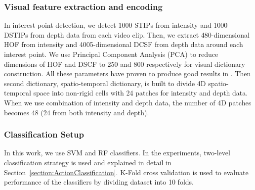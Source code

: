 \documentclass[a4paper, 10pt, conference]{ieeeconf}      %
\begin{document}

    	\subsubsection{Visual feature extraction and encoding}
        \label{section:VisualFeatureExtractionAndEncoding}
        In interest point detection, we detect 1000 STIPs from intensity and 1000 DSTIPs from depth data from each video clip. Then, we extract 480-dimensional HOF from intensity and 4005-dimensional DCSF from depth data around each interest point. We use Principal Component Analysis (PCA) to reduce dimensions of HOF and DSCF to 250 and 800 respectively for visual dictionary construction. All these parameters have proven to produce good results in \cite{c1}. 
        Then second dictionary, spatio-temporal dictionary, is built to divide 4D spatio-temporal space into non-rigid cells with 24 patches for intensity and depth data. When we use combination of intensity and depth data, the number of 4D patches becomes 48 (24 from both intensity and depth).

        
        \subsubsection{Classification Setup}
        \label{section:ClassificationStrategy}
        In this work, we use SVM and RF classifiers. In the experiments, two-level classification strategy is used and explained in detail in Section~\ref{section:ActionClassification}. K-Fold cross validation is used to evaluate performance of the classifiers by dividing dataset into 10 folds.
        
\end{document}
